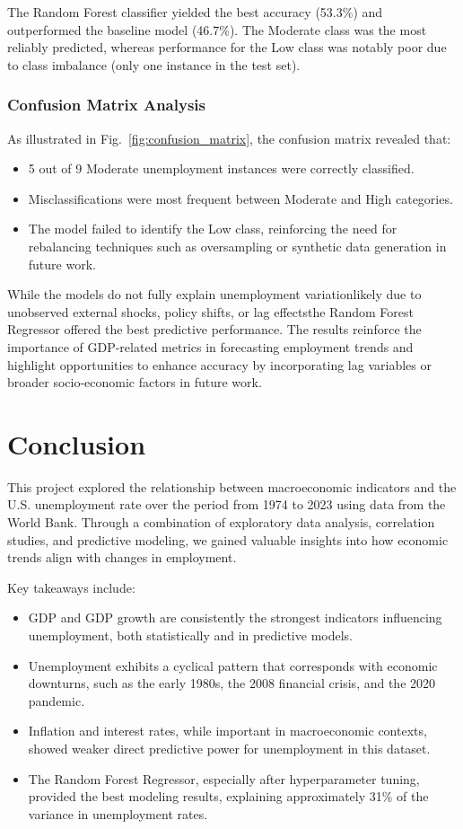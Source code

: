\documentclass[conference]{IEEEtran}
\begin{document}
The Random Forest classifier yielded the best accuracy (53.3\%) and outperformed the baseline model (46.7\%). The Moderate class was the most reliably predicted, whereas performance for the Low class was notably poor due to class imbalance (only one instance in the test set).
\subsubsection*{Confusion Matrix Analysis}
As illustrated in Fig.~\ref{fig:confusion_matrix}, the confusion matrix revealed that:
\begin{itemize}
    \item 5 out of 9 Moderate unemployment instances were correctly classified.
    \item Misclassifications were most frequent between Moderate and High categories.
    \item The model failed to identify the Low class, reinforcing the need for rebalancing techniques such as oversampling or synthetic data generation in future work.
\end{itemize}

While the models do not fully explain unemployment variation\textemdash likely due to unobserved external shocks, policy shifts, or lag effects\textemdash the Random Forest Regressor offered the best predictive performance. The results reinforce the importance of GDP-related metrics in forecasting employment trends and highlight opportunities to enhance accuracy by incorporating lag variables or broader socio-economic factors in future work.


\section{Conclusion}

This project explored the relationship between macroeconomic indicators and the U.S. unemployment rate over the period from 1974 to 2023 using data from the World Bank. Through a combination of exploratory data analysis, correlation studies, and predictive modeling, we gained valuable insights into how economic trends align with changes in employment.

Key takeaways include:
\begin{itemize}
    \item GDP and GDP growth are consistently the strongest indicators influencing unemployment, both statistically and in predictive models.
    \item Unemployment exhibits a cyclical pattern that corresponds with economic downturns, such as the early 1980s, the 2008 financial crisis, and the 2020 pandemic.
    \item Inflation and interest rates, while important in macroeconomic contexts, showed weaker direct predictive power for unemployment in this dataset.
    \item The Random Forest Regressor, especially after hyperparameter tuning, provided the best modeling results, explaining approximately 31\% of the variance in unemployment rates.
\end{itemize}
\end{document}
